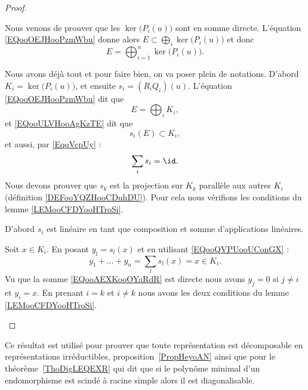 \begin{proof}
\begin{subproof}
\begin{subproof}
			Nous venons de prouver que les \( \ker\big( P_i(u) \big)\) sont en somme directe. L'équation \eqref{EQooOEJHooPzmWbu} donne alors \( E\subset\bigoplus_i\ker\big( P_i(u) \big)\) et donc
			\begin{equation}
				E=\bigoplus_{i=1}^n\ker\big( P_i(u) \big).
			\end{equation}
		\end{subproof}
		Nous avons déjà tout et pour faire bien, on va poser plein de notations. D'abord \( K_i=\ker\big( P_i(u) \big)\), et ensuite \( s_i=(R_iQ_i)(u)\). L'équation \eqref{EQooOEJHooPzmWbu} dit que
		\begin{equation}		\label{EQooAEXKooOYaRdR}
			E=\bigoplus_iK_i,
		\end{equation}
		et \eqref{EQooULVHooAgKzTE} dit que
		\begin{equation}
			s_i(E)\subset K_i,
		\end{equation}
		et aussi, par \eqref{EqqVcpUy} :
		\begin{equation}		\label{EQooQVPUooUConGX}
			\sum_is_i=\id.
		\end{equation}
		Nous devons prouver que \( s_k\) est la projection sur \( K_k\) parallèle aux autres \( K_i\) (définition \ref{DEFooYQZHooCDuhDU}). Pour cela nous vérifions les conditions du lemme \ref{LEMooCFDYooHTroSi}.

		D'abord \( s_i\) est linéaire en tant que composition et somme d'applications linéaires.

		Soit \( x\in K_i\). En posant \( y_l=s_l(x)\) et en utilisant \eqref{EQooQVPUooUConGX} :
		\begin{equation}
			y_1+\ldots+y_n=\sum_ls_l(x)=x	\in K_i.
		\end{equation}
		Vu que la somme \eqref{EQooAEXKooOYaRdR} est directe nous avons \( y_j=0\) si \( j\neq i\) et \( y_i=x\). En prenant \( i=k\) et \( i\neq k\) nous avons les deux conditions du lemme \ref{LEMooCFDYooHTroSi}.
	\end{subproof}
\end{proof}

\begin{normaltext}
	Ce résultat est utilisé pour prouver que toute représentation est décomposable en représentations irréductibles, proposition~\ref{PropHeyoAN} ainsi que pour le théorème~\ref{ThoDigLEQEXR} qui dit que si le polynôme minimal d'un endomorphisme est scindé à racine simple alors il est diagonalisable.
\end{normaltext}

